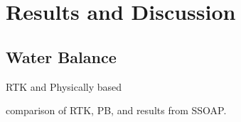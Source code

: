 \chapter{Results and Discussion}

\section{Water Balance}

RTK and Physically based

comparison of RTK, PB, and results from SSOAP.